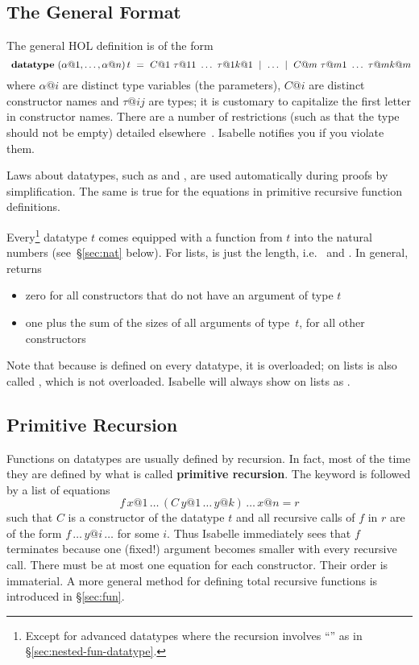 \subsection{The General Format}
\label{sec:general-datatype}

The general HOL  definition is of the form
\[
\isacommand{datatype}~(\alpha@1, \dots, \alpha@n) \, t ~=~
C@1~\tau@{11}~\dots~\tau@{1k@1} ~\mid~ \dots ~\mid~
C@m~\tau@{m1}~\dots~\tau@{mk@m}
\]
where $\alpha@i$ are distinct type variables (the parameters), $C@i$ are distinct
constructor names and $\tau@{ij}$ are types; it is customary to capitalize
the first letter in constructor names. There are a number of
restrictions (such as that the type should not be empty) detailed
elsewhere~\cite{isabelle-HOL}. Isabelle notifies you if you violate them.

Laws about datatypes, such as  and
, are used automatically
during proofs by simplification.  The same is true for the equations in
primitive recursive function definitions.

Every\footnote{Except for advanced datatypes where the recursion involves
``\isasymRightarrow'' as in {\S}\ref{sec:nested-fun-datatype}.} datatype $t$
comes equipped with a  function from $t$ into the natural numbers
(see~{\S}\ref{sec:nat} below). For lists,  is just the length, i.e.\
 and .  In general,
\cdx{size} returns
\begin{itemize}
\item zero for all constructors
that do not have an argument of type $t$\\
\item one plus the sum of the sizes of all arguments of type~$t$,
for all other constructors
\end{itemize}
Note that because
 is defined on every datatype, it is overloaded; on lists
 is also called \sdx{length}, which is not overloaded.
Isabelle will always show \isa{size} on lists as \isa{length}.


\subsection{Primitive Recursion}

%
Functions on datatypes are usually defined by recursion. In fact, most of the
time they are defined by what is called \textbf{primitive recursion}.
The keyword \commdx{primrec} is followed by a list of
equations
\[ f \, x@1 \, \dots \, (C \, y@1 \, \dots \, y@k)\, \dots \, x@n = r \]
such that $C$ is a constructor of the datatype $t$ and all recursive calls of
$f$ in $r$ are of the form $f \, \dots \, y@i \, \dots$ for some $i$. Thus
Isabelle immediately sees that $f$ terminates because one (fixed!) argument
becomes smaller with every recursive call. There must be at most one equation
for each constructor.  Their order is immaterial.
A more general method for defining total recursive functions is introduced in
{\S}\ref{sec:fun}.


